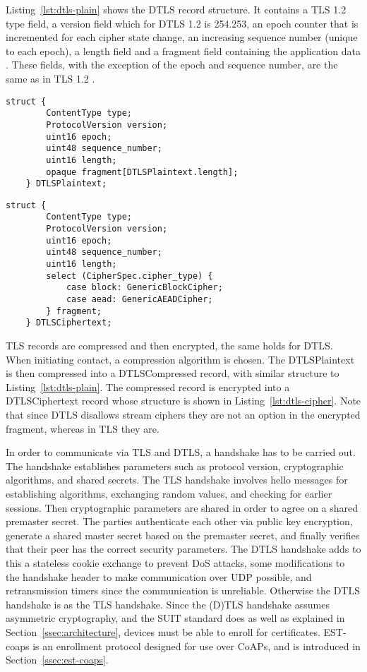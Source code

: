 \documentclass[0-thesis.tex]{subfiles}
\begin{document}
Listing~\ref{lst:dtls-plain} shows the DTLS record structure. It contains a TLS 1.2 type
field, a version field which for DTLS 1.2 is 254.253, an epoch counter that is incremented
for each cipher state change, an increasing sequence number (unique to each epoch), a
length field and a fragment field containing the application data \parencite{rfc5246}.
These fields, with the exception of the epoch and sequence number, are the same 
as in TLS 1.2 \parencite{rfc6347}.

\lstset{language=C}
\begin{lstlisting}[caption={The DTLS plaintext record structure.}, 
                    label={lst:dtls-plain}]
    struct {
        ContentType type;
        ProtocolVersion version;
        uint16 epoch;
        uint48 sequence_number;
        uint16 length;
        opaque fragment[DTLSPlaintext.length];
    } DTLSPlaintext;
\end{lstlisting}

\begin{lstlisting}[caption={The DTLS ciphertext record structure.}, 
                    label={lst:dtls-cipher}]
    struct {
        ContentType type;
        ProtocolVersion version;
        uint16 epoch;
        uint48 sequence_number;
        uint16 length;
        select (CipherSpec.cipher_type) {
            case block: GenericBlockCipher;
            case aead: GenericAEADCipher;
        } fragment;
    } DTLSCiphertext;
\end{lstlisting}

TLS records are compressed and then encrypted, the same holds for DTLS. When initiating
contact, a compression algorithm is chosen. The DTLSPlaintext is then compressed into a
DTLSCompressed record, with similar structure to Listing~\ref{lst:dtls-plain}. The
compressed record is encrypted into a DTLSCiphertext record whose structure is shown in
Listing~\ref{lst:dtls-cipher}. Note that since DTLS disallows stream ciphers they are not
an option in the encrypted fragment, whereas in TLS they are.

In order to communicate via TLS and DTLS, a handshake has to be carried out. The handshake
establishes parameters such as protocol version, cryptographic algorithms, and shared
secrets. The TLS handshake involves hello messages for establishing algorithms, exchanging
random values, and checking for earlier sessions. Then cryptographic parameters are shared
in order to agree on a shared premaster secret. The parties authenticate each other via
public key encryption, generate a shared master secret based on the premaster secret, and
finally verifies that their peer has the correct security parameters. The DTLS handshake
adds to this a stateless cookie exchange to prevent DoS attacks, some modifications to the
handshake header to make communication over UDP possible, and retransmission timers since
the communication is unreliable. Otherwise the DTLS handshake is as the TLS handshake.
Since the (D)TLS handshake assumes asymmetric cryptography, and the SUIT standard does as
well as explained in Section~\ref{ssec:architecture}, devices must be able to enroll for
certificates. EST-coaps is an enrollment protocol designed for use over CoAPs, and is
introduced in Section~\ref{ssec:est-coaps}.
\end{document}
